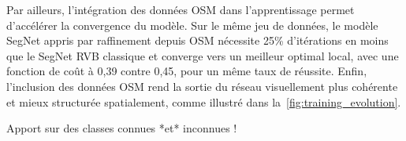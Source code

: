 Par ailleurs, l'intégration des données OSM dans l'apprentissage permet d'accélérer la convergence du modèle. Sur le même jeu de données, le modèle SegNet appris par raffinement depuis OSM nécessite 25\% d'itérations en moins que le SegNet RVB classique et converge vers un meilleur optimal local, avec une fonction de coût à 0,39 contre 0,45, pour un même taux de réussite. Enfin, l'inclusion des données OSM rend la sortie du réseau visuellement plus cohérente et mieux structurée spatialement, comme illustré dans la~\cref{fig:training_evolution}.

Apport sur des classes connues *et* inconnues !



